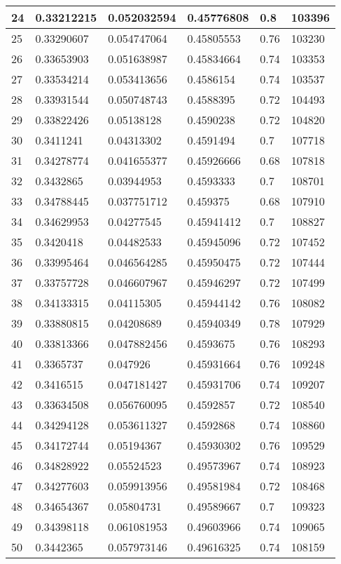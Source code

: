 \begin{longtable}{|l|l|l|l|l|l|}
24 & 0.33212215 & 0.052032594 & 0.45776808 & 0.8 & 103396 \\ \hline 
25 & 0.33290607 & 0.054747064 & 0.45805553 & 0.76 & 103230 \\ \hline 
26 & 0.33653903 & 0.051638987 & 0.45834664 & 0.74 & 103353 \\ \hline 
27 & 0.33534214 & 0.053413656 & 0.4586154 & 0.74 & 103537 \\ \hline 
28 & 0.33931544 & 0.050748743 & 0.4588395 & 0.72 & 104493 \\ \hline 
29 & 0.33822426 & 0.05138128 & 0.4590238 & 0.72 & 104820 \\ \hline 
30 & 0.3411241 & 0.04313302 & 0.4591494 & 0.7 & 107718 \\ \hline 
31 & 0.34278774 & 0.041655377 & 0.45926666 & 0.68 & 107818 \\ \hline 
32 & 0.3432865 & 0.03944953 & 0.4593333 & 0.7 & 108701 \\ \hline 
33 & 0.34788445 & 0.037751712 & 0.459375 & 0.68 & 107910 \\ \hline 
34 & 0.34629953 & 0.04277545 & 0.45941412 & 0.7 & 108827 \\ \hline 
35 & 0.3420418 & 0.04482533 & 0.45945096 & 0.72 & 107452 \\ \hline 
36 & 0.33995464 & 0.046564285 & 0.45950475 & 0.72 & 107444 \\ \hline 
37 & 0.33757728 & 0.046607967 & 0.45946297 & 0.72 & 107499 \\ \hline 
38 & 0.34133315 & 0.04115305 & 0.45944142 & 0.76 & 108082 \\ \hline 
39 & 0.33880815 & 0.04208689 & 0.45940349 & 0.78 & 107929 \\ \hline 
40 & 0.33813366 & 0.047882456 & 0.4593675 & 0.76 & 108293 \\ \hline 
41 & 0.3365737 & 0.047926 & 0.45931664 & 0.76 & 109248 \\ \hline 
42 & 0.3416515 & 0.047181427 & 0.45931706 & 0.74 & 109207 \\ \hline 
43 & 0.33634508 & 0.056760095 & 0.4592857 & 0.72 & 108540 \\ \hline 
44 & 0.34294128 & 0.053611327 & 0.4592868 & 0.74 & 108860 \\ \hline 
45 & 0.34172744 & 0.05194367 & 0.45930302 & 0.76 & 109529 \\ \hline 
46 & 0.34828922 & 0.05524523 & 0.49573967 & 0.74 & 108923 \\ \hline 
47 & 0.34277603 & 0.059913956 & 0.49581984 & 0.72 & 108468 \\ \hline 
48 & 0.34654367 & 0.05804731 & 0.49589667 & 0.7 & 109323 \\ \hline 
49 & 0.34398118 & 0.061081953 & 0.49603966 & 0.74 & 109065 \\ \hline 
50 & 0.3442365 & 0.057973146 & 0.49616325 & 0.74 & 108159 \\ \hline 
\end{longtable}